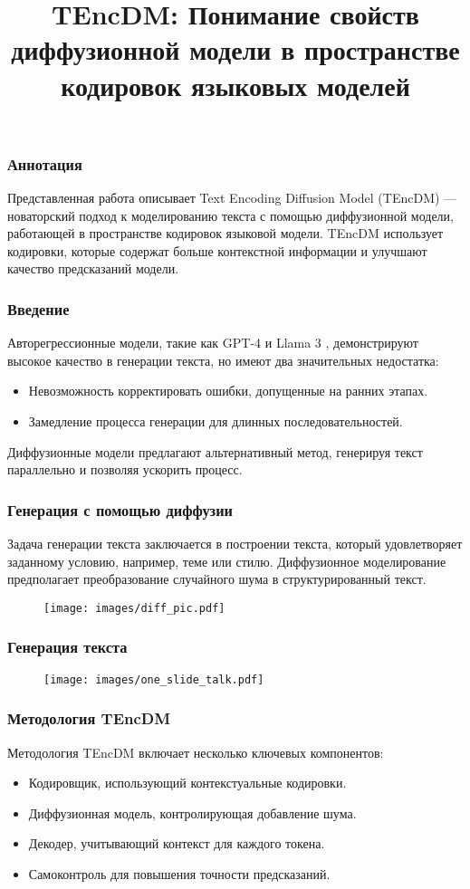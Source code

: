 \documentclass{beamer}
\title{TEncDM: Понимание свойств диффузионной модели в пространстве кодировок языковых моделей}
\author{}
\date{}
\begin{document}
\frame{\titlepage}

\begin{frame}
\frametitle{Аннотация}
Представленная работа описывает Text Encoding Diffusion Model (TEncDM) — новаторский подход к моделированию текста с помощью диффузионной модели, работающей в пространстве кодировок языковой модели. TEncDM использует кодировки, которые содержат больше контекстной информации и улучшают качество предсказаний модели.
\end{frame}

\begin{frame}
\frametitle{Введение}
Авторегрессионные модели, такие как GPT-4 \cite{gpt4} и Llama 3 \cite{llama3}, демонстрируют высокое качество в генерации текста, но имеют два значительных недостатка:
\begin{itemize}
    \item Невозможность корректировать ошибки, допущенные на ранних этапах.
    \item Замедление процесса генерации для длинных последовательностей.
\end{itemize}
Диффузионные модели предлагают альтернативный метод, генерируя текст параллельно и позволяя ускорить процесс.
\end{frame}

\begin{frame}
\frametitle{Генерация с помощью диффузии}
Задача генерации текста заключается в построении текста, который удовлетворяет заданному условию, например, теме или стилю. Диффузионное моделирование предполагает преобразование случайного шума в структурированный текст.
\begin{figure}
\centering
\texttt{[image: images/diff\_pic.pdf]}
\end{figure}
\end{frame}

\begin{frame}
\frametitle{Генерация текста}
\begin{figure}
\centering
\texttt{[image: images/one\_slide\_talk.pdf]}
\end{figure}
\end{frame}

\begin{frame}
\frametitle{Методология TEncDM}
Методология TEncDM включает несколько ключевых компонентов:
\begin{itemize}
    \item Кодировщик, использующий контекстуальные кодировки.
    \item Диффузионная модель, контролирующая добавление шума.
    \item Декодер, учитывающий контекст для каждого токена.
    \item Самоконтроль для повышения точности предсказаний.
\end{itemize}
\end{frame}
\end{document}

